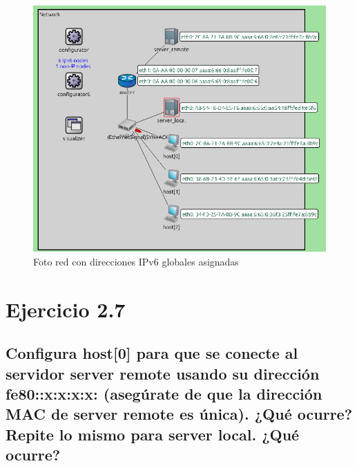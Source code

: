 \begin{figure}[H]
    \centering
    \includegraphics[width=135mm, scale=0.75]{imaxes/captura_ejer2_6.png}
    \caption{Foto red con direcciones IPv6 globales asignadas}
    \label{fig:ip_global_host0}
\end{figure}

\section{Ejercicio 2.7}
\subsection{Configura host[0] para que se conecte al servidor server remote usando su dirección fe80::x:x:x:x:
(asegúrate de que la dirección MAC de server remote es única). ¿Qué ocurre? Repite lo mismo para
server local. ¿Qué ocurre?}

